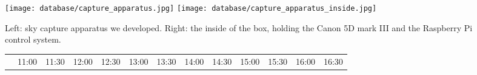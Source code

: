 \begin{figure}
\centering
\texttt{[image: database/capture\_apparatus.jpg]}
\texttt{[image: database/capture\_apparatus\_inside.jpg]}
\caption{Left: sky capture apparatus we developed. Right: the inside of the box, holding the Canon 5D mark III and the Raspberry Pi control system.}
\label{fig:capture-apparatus}
\end{figure}


\begin{figure}
    \centering
    \setlength{\tabcolsep}{0pt} 
    \newcommand{\customwidth}{.078\linewidth}
    \begin{tabular}{@{}rcccccccccccc@{}}
                                                     &
    \begin{minipage}{\customwidth}\centering\scriptsize 11:00 \end{minipage} &
    \begin{minipage}{\customwidth}\centering\scriptsize 11:30 \end{minipage} &
    \begin{minipage}{\customwidth}\centering\scriptsize 12:00 \end{minipage} &
    \begin{minipage}{\customwidth}\centering\scriptsize 12:30 \end{minipage} &
    \begin{minipage}{\customwidth}\centering\scriptsize 13:00 \end{minipage} &
    \begin{minipage}{\customwidth}\centering\scriptsize 13:30 \end{minipage} &
    \begin{minipage}{\customwidth}\centering\scriptsize 14:00 \end{minipage} &
    \begin{minipage}{\customwidth}\centering\scriptsize 14:30 \end{minipage} &
    \begin{minipage}{\customwidth}\centering\scriptsize 15:00 \end{minipage} &
    \begin{minipage}{\customwidth}\centering\scriptsize 15:30 \end{minipage} &
    \begin{minipage}{\customwidth}\centering\scriptsize 16:00 \end{minipage} &
    \begin{minipage}{\customwidth}\centering\scriptsize 16:30 \end{minipage}

\end{tabular}
\end{figure}
